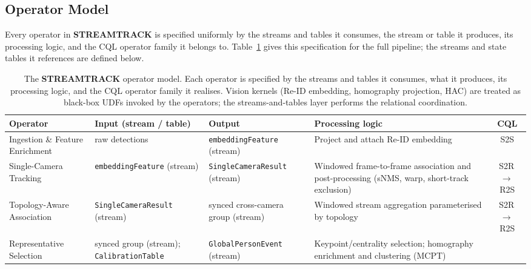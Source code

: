 \documentclass[5p,times]{elsarticle}
\begin{document}
\subsection{Operator Model}
\label{sec:overview:operatormodel}
Every operator in \textbf{STREAMTRACK} is specified uniformly by the streams and tables it consumes, the stream or table it produces, its processing logic, and the CQL operator
family it belongs to. Table~\ref{tab:operatormodel} gives this specification for the full pipeline; the streams and state tables it references are defined below.%

\begin{table}[tbh!]
    \centering
    \caption{The \textbf{STREAMTRACK} operator model. Each operator is specified by the streams and tables it consumes, what it produces, its processing logic, and the CQL operator family it realises. Vision kernels (Re-ID embedding, homography projection, HAC) are treated as black-box UDFs invoked by the operators; the streams-and-tables layer performs the relational
    coordination.}
    \label{tab:operatormodel}
    \small
    \setlength{\tabcolsep}{4pt}
    \renewcommand{\arraystretch}{1.25}
    \begin{tabularx}{\textwidth}{@{} l X X X c @{}}
        \toprule
        \textbf{Operator} & \textbf{Input (stream / table)} & \textbf{Output} & \textbf{Processing logic} & \textbf{CQL} \\
        \midrule
        Ingestion \& Feature Enrichment
            & raw detections
            & \texttt{embeddingFeature} (stream)
            & Project and attach Re-ID embedding
            & S2S \\
        \addlinespace
        Single-Camera Tracking
            & \texttt{embeddingFeature} (stream)
            & \texttt{SingleCameraResult} (stream)
            & Windowed frame-to-frame association and post-processing (sNMS, warp, short-track exclusion)
            & S2R\,$\to$\,R2S \\
        \addlinespace
        Topology-Aware Association
            & \texttt{SingleCameraResult} (stream)
            & synced cross-camera group (stream)
            & Windowed stream aggregation parameterised by topology
            & S2R\,$\to$\,R2S \\
        \addlinespace
        Representative Selection
            & synced group (stream); \texttt{CalibrationTable}
            & \texttt{GlobalPersonEvent} (stream)
            & Keypoint/centrality selection; homography enrichment and clustering (MCPT)

\end{tabularx}
\end{table}
\end{document}
